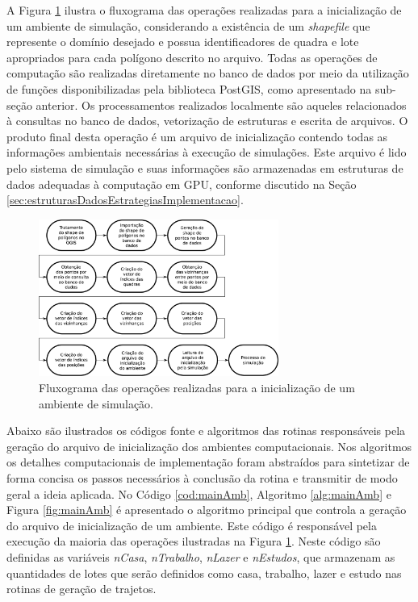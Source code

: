 A Figura \ref{fig:inicializacaoAmbiente} ilustra o fluxograma das operações realizadas para a inicialização de um ambiente de simulação, considerando a existência de um \textit{shapefile} que represente o domínio desejado e possua identificadores de quadra e lote apropriados para cada polígono descrito no arquivo. Todas as operações de computação são realizadas diretamente no banco de dados por meio da utilização de funções disponibilizadas pela biblioteca PostGIS, como apresentado na sub-seção anterior. Os processamentos realizados localmente são aqueles relacionados à consultas no banco de dados, vetorização de estruturas e escrita de arquivos. O produto final desta operação é um arquivo de inicialização contendo todas as informações ambientais necessárias à execução de simulações. Este arquivo é lido pelo sistema de simulação e suas informações são armazenadas em estruturas de dados adequadas à computação em GPU, conforme discutido na Seção \ref{sec:estruturasDadosEstrategiasImplementacao}.

\begin{figure}[H]
  \centering
  \includegraphics[width=0.7\textwidth]{Figuras/Simula/inicializacaoAmbiente.eps}
  \caption{Fluxograma das operações realizadas para a inicialização de um ambiente de simulação.}
  \label{fig:inicializacaoAmbiente}
\end{figure} 

\newpage

Abaixo são ilustrados os códigos fonte e algoritmos das rotinas responsáveis pela geração do arquivo de inicialização dos ambientes computacionais. Nos algoritmos os detalhes computacionais de implementação foram abstraídos para sintetizar de forma concisa os passos necessários à conclusão da rotina e transmitir de modo geral a ideia aplicada. No Código \ref{cod:mainAmb}, Algoritmo \ref{alg:mainAmb} e Figura \ref{fig:mainAmb} é apresentado o algoritmo principal que controla a geração do arquivo de inicialização de um ambiente. Este código é responsável pela execução da maioria das operações ilustradas na Figura \ref{fig:inicializacaoAmbiente}. Neste código são definidas as variáveis \textit{nCasa}, \textit{nTrabalho}, \textit{nLazer} e \textit{nEstudos}, que armazenam as quantidades de lotes que serão definidos como casa, trabalho, lazer e estudo nas rotinas de geração de trajetos. 

